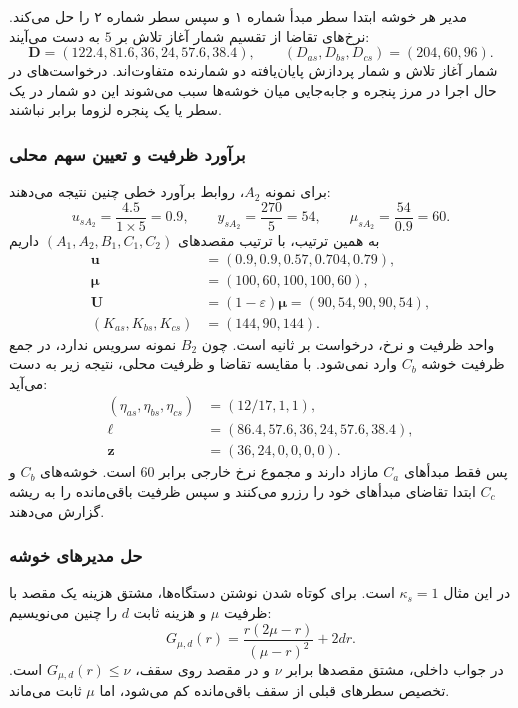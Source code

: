 مدیر هر خوشه ابتدا سطر مبدأ شماره ۱ و سپس سطر شماره ۲ را حل می‌کند. نرخ‌های تقاضا از تقسیم شمار آغاز تلاش بر $5$ به دست می‌آیند:
\begin{equation}
 \boldsymbol D=(122.4,81.6,36,24,57.6,38.4),\qquad
 (D_{as},D_{bs},D_{cs})=(204,60,96).
\end{equation}
شمار آغاز تلاش و شمار پردازش پایان‌یافته دو شمارنده متفاوت‌اند. درخواست‌های در حال اجرا در مرز پنجره و جابه‌جایی میان خوشه‌ها سبب می‌شوند این دو شمار در یک سطر یا یک پنجره لزوما برابر نباشند.

\subsubsection{برآورد ظرفیت و تعیین سهم محلی}

برای نمونه $A_2$، روابط برآورد خطی چنین نتیجه می‌دهند:
\begin{equation}
 u_{sA_2}=\frac{4.5}{1\times5}=0.9,\qquad
 y_{sA_2}=\frac{270}{5}=54,\qquad
 \mu_{sA_2}=\frac{54}{0.9}=60.
\end{equation}
به همین ترتیب، با ترتیب مقصدهای $(A_1,A_2,B_1,C_1,C_2)$ داریم
\begin{align}
 \boldsymbol u&=(0.9,0.9,0.57,0.704,0.79),\\
 \boldsymbol\mu&=(100,60,100,100,60),\\
 \boldsymbol U&=(1-\varepsilon)\boldsymbol\mu=(90,54,90,90,54),\\
 (K_{as},K_{bs},K_{cs})&=(144,90,144).
\end{align}
واحد ظرفیت و نرخ، درخواست بر ثانیه است. چون $B_2$ نمونه سرویس ندارد، در جمع ظرفیت خوشه $C_b$ وارد نمی‌شود. با مقایسه تقاضا و ظرفیت محلی، نتیجه زیر به دست می‌آید:
\begin{align}
 (\eta_{as},\eta_{bs},\eta_{cs})&=(12/17,1,1),\\
 \boldsymbol\ell&=(86.4,57.6,36,24,57.6,38.4),\\
 \boldsymbol z&=(36,24,0,0,0,0).
\end{align}
پس فقط مبدأهای $C_a$ مازاد دارند و مجموع نرخ خارجی برابر $60$ است. خوشه‌های $C_b$ و $C_c$ ابتدا تقاضای مبدأهای خود را رزرو می‌کنند و سپس ظرفیت باقی‌مانده را به ریشه گزارش می‌دهند.

\subsubsection{حل مدیرهای خوشه}

در این مثال $\kappa_s=1$ است. برای کوتاه شدن نوشتن دستگاه‌ها، مشتق هزینه یک مقصد با ظرفیت $\mu$ و هزینه ثابت $d$ را چنین می‌نویسیم:
\begin{equation}
 G_{\mu,d}(r)=\frac{r(2\mu-r)}{(\mu-r)^2}+2dr.
\end{equation}
در جواب داخلی، مشتق مقصدها برابر $\nu$ و در مقصد روی سقف، $G_{\mu,d}(r)\leq\nu$ است. تخصیص سطرهای قبلی از سقف باقی‌مانده کم می‌شود، اما $\mu$ ثابت می‌ماند.

